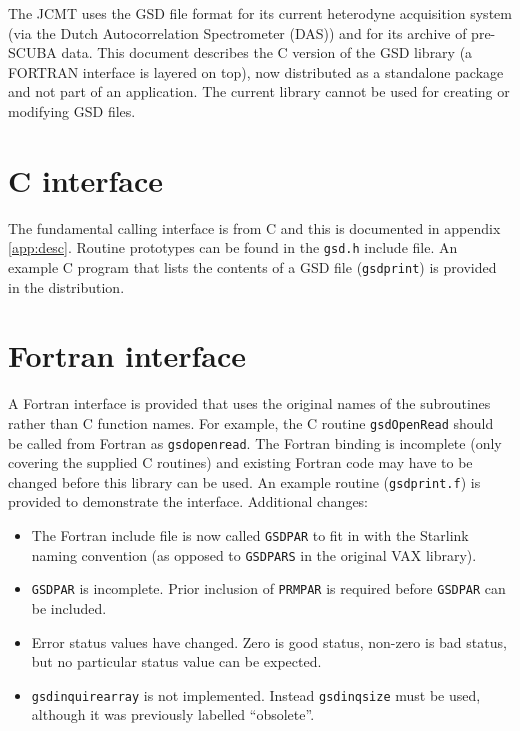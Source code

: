 \documentclass[twoside,11pt]{article}
\renewcommand{\_}{\texttt{\symbol{95}}}
\begin{document}
The JCMT uses the GSD file format for its current heterodyne acquisition
system (via the Dutch Autocorrelation Spectrometer (DAS)) and for its archive
of pre-SCUBA data.  This document describes the C version of the GSD library
(a FORTRAN interface is layered on top), now distributed as a standalone
package and not part of an application. The current library cannot be used for
creating or modifying GSD files.


\section{C interface}

The fundamental calling interface is from C and this is documented in appendix
\ref{app:desc}. Routine prototypes can be found in the \texttt{gsd.h} include
file. An example C program that lists the contents of a GSD file
(\texttt{gsdprint}) is provided in the distribution.

\section{Fortran interface}

A Fortran interface is provided that uses the original names of the
subroutines rather than C function names. For example, the C routine
\texttt{gsdOpenRead} should be called from Fortran as \texttt{gsd\_open\_read}.
The Fortran binding is incomplete (only covering the supplied C routines) and
existing Fortran code may have to be changed before this library can be
used. An example routine (\texttt{gsd\_print.f}) is provided to demonstrate
the interface. Additional changes:

\begin{itemize}
\item The Fortran include file is now called \texttt{GSD\_PAR} to fit in with
the Starlink naming convention (as opposed to \texttt{GSDPARS} in the original
VAX library).

\item \texttt{GSD\_PAR} is incomplete. Prior inclusion of \texttt{PRM\_PAR}
is required before \texttt{GSD\_PAR} can be included.

\item Error status values have changed. Zero is good status, non-zero is
   bad status, but no particular status value can be expected.

\item \texttt{gsd\_inquire\_array} is not implemented. Instead
\texttt{gsd\_inq\_size} must be used, although it was previously labelled
``obsolete''.

\end{itemize}
\end{document}
